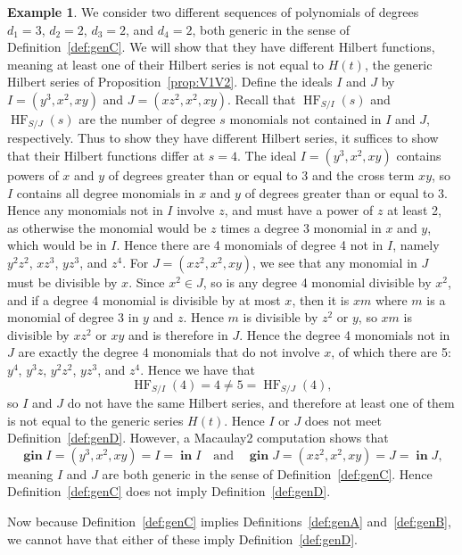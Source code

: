 \documentclass[11pt]{article}
\DeclareMathOperator{\Init}{\mathbf{in}}
\DeclareMathOperator{\HF}{HF}
\DeclareMathOperator{\gin}{\mathbf{gin}}
\theoremstyle{definition}
\newtheorem{example}{Example}
\begin{document}
\begin{example}
	We consider two different sequences of polynomials of degrees $d_1 = 3$, $d_2 = 2$, $d_3 = 2$, and $d_4 = 2$, both generic in the sense of Definition~\ref{def:genC}. We will show that they have different Hilbert functions, meaning at least one of their Hilbert series is not equal to $H(t)$, the generic Hilbert series of Proposition~\ref{prop:V1V2}. Define the ideals $I$ and $J$ by $I = (y^3, x^2, xy)$ and $J = (xz^2, x^2, xy)$. Recall that $\HF_{S/I}(s)$ and $\HF_{S/J}(s)$ are the number of degree $s$ monomials not contained in $I$ and $J$, respectively. Thus to show they have different Hilbert series, it suffices to show that their Hilbert functions differ at $s = 4$. The ideal $I = (y^3, x^2, xy)$ contains powers of $x$ and $y$ of degrees greater than or equal to 3 and the cross term $xy$, so $I$ contains all degree monomials in $x$ and $y$ of degrees greater than or equal to 3. Hence any monomials not in $I$ involve $z$, and must have a power of $z$ at least 2, as otherwise the monomial would be $z$ times a degree 3 monomial in $x$ and $y$, which would be in $I$. Hence there are 4 monomials of degree 4 not in $I$, namely $y^2 z^2$, $xz^3$, $yz^3$, and $z^4$. For $J = (xz^2, x^2, xy)$, we see that any monomial in $J$ must be divisible by $x$. Since $x^2 \in J$, so is any degree 4 monomial divisible by $x^2$, and if a degree 4 monomial is divisible by at most $x$, then it is $xm$ where $m$ is a monomial of degree 3 in $y$ and $z$. Hence $m$ is divisible by $z^2$ or $y$, so $xm$ is divisible by $xz^2$ or $xy$ and is therefore in $J$. Hence the degree 4 monomials not in $J$ are exactly the degree 4 monomials that do not involve $x$, of which there are 5: $y^4$, $y^3z$, $y^2z^2$, $yz^3$, and $z^4$. Hence we have that \[ \HF_{S/I}(4) = 4 \neq 5 = \HF_{S/J}(4), \] so $I$ and $J$ do not have the same Hilbert series, and therefore at least one of them is not equal to the generic series $H(t)$. Hence $I$ or $J$ does not meet Definition~\ref{def:genD}. However, a Macaulay2 computation shows that \[ \gin I = (y^3, x^2, xy) = I = \Init I \quad \text{and} \quad \gin J = (xz^2, x^2, xy) = J = \Init J, \] meaning $I$ and $J$ are both generic in the sense of Definition~\ref{def:genC}. Hence Definition~\ref{def:genC} does not imply Definition~\ref{def:genD}.
\end{example}


Now because Definition~\ref{def:genC} implies Definitions~\ref{def:genA} and~\ref{def:genB}, we cannot have that either of these imply Definition~\ref{def:genD}. \\
\end{document}
